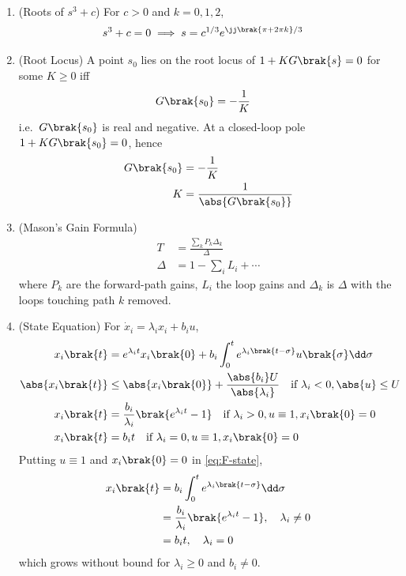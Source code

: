 \begin{enumerate}[label=\thesubsection.\arabic*, ref=\thesubsection.\theenumi, itemsep=0pt, leftmargin=0pt, labelwidth=0pt, itemindent=0pt, labelsep=1em, align=right]
\item (Roots of $s^3 + c$) For $c > 0$ and $k = 0, 1, 2$,
\begin{align}
s^3 + c = 0 &\implies s = c^{1/3} e^{\jj \brak{\pi + 2\pi k}/3}
\label{eq:F-cubic-roots}
\end{align}

\item (Root Locus) A point $s_0$ lies on the root locus of $1 + K G\brak{s} = 0$ for some $K \ge 0$ iff
\begin{align}
G\brak{s_0} &= -\frac{1}{K}
\label{eq:F-rootlocus}
\end{align}
i.e.\ $G\brak{s_0}$ is real and negative.
\solution At a closed-loop pole $1 + K G\brak{s_0} = 0$, hence
\begin{align}
G\brak{s_0} &= -\frac{1}{K}
\\
K &= \frac{1}{\abs{G\brak{s_0}}}
\end{align}

\item (Mason's Gain Formula)
\begin{align}
T &= \frac{\sum_{k} P_k \Delta_k}{\Delta}
\label{eq:F-mason}
\\
\Delta &= 1 - \sum_{i} L_i + \cdots
\end{align}
where $P_k$ are the forward-path gains, $L_i$ the loop gains and $\Delta_k$ is $\Delta$ with the loops touching path $k$ removed.

\item (State Equation) For $\dot{x}_i = \lambda_i x_i + b_i u$,
\begin{align}
x_i\brak{t} &= e^{\lambda_i t} x_i\brak{0} + b_i \int_{0}^{t} e^{\lambda_i \brak{t - \sigma}} u\brak{\sigma} \dd \sigma
\label{eq:F-state}
\\
\abs{x_i\brak{t}} &\le \abs{x_i\brak{0}} + \frac{\abs{b_i} U}{\abs{\lambda_i}} \quad \text{if } \lambda_i < 0, \abs{u} \le U
\label{eq:F-state-bounded}
\\
x_i\brak{t} &= \frac{b_i}{\lambda_i}\brak{e^{\lambda_i t} - 1} \quad \text{if } \lambda_i > 0, u \equiv 1, x_i\brak{0} = 0
\label{eq:F-state-unbounded}
\\
x_i\brak{t} &= b_i t \quad \text{if } \lambda_i = 0, u \equiv 1, x_i\brak{0} = 0
\label{eq:F-state-integrator}
\end{align}
\solution Putting $u \equiv 1$ and $x_i\brak{0} = 0$ in \eqref{eq:F-state},
\begin{align}
x_i\brak{t} &= b_i \int_{0}^{t} e^{\lambda_i \brak{t - \sigma}} \dd \sigma
\\
&= \frac{b_i}{\lambda_i}\brak{e^{\lambda_i t} - 1}, \quad \lambda_i \ne 0
\\
&= b_i t, \quad \lambda_i = 0
\end{align}
which grows without bound for $\lambda_i \ge 0$ and $b_i \ne 0$.


\end{enumerate}
